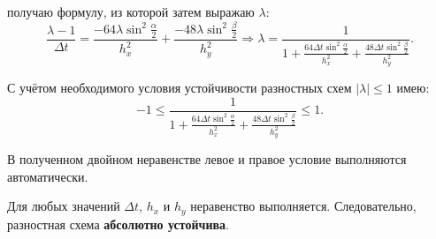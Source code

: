 \documentclass[12pt, a4paper]{report}
\begin{document}
	\par
	получаю формулу, из которой затем выражаю $\lambda$:
	\begin{equation*}
		\frac{\lambda - 1}{\Delta t} = \frac{-64\lambda\sin^{2}{\frac{\alpha}{2}}}{h_{x}^{2}} + \frac{-48\lambda\sin^{2}{\frac{\beta}{2}}}{h_{y}^{2}} \Rightarrow \lambda = \frac{1}{1 + \frac{64\Delta t\sin^{2}{\frac{\alpha}{2}}}{h_{x}^{2}} + \frac{48\Delta t\sin^{2}{\frac{\beta}{2}}}{h_{y}^{2}}}.
	\end{equation*}
	\par
	С учётом необходимого условия устойчивости разностных схем $\lvert \lambda \rvert \le 1$ имею:
	\begin{equation*}
		-1 \le \frac{1}{1 + \frac{64\Delta t\sin^{2}{\frac{\alpha}{2}}}{h_{x}^{2}} + \frac{48\Delta t\sin^{2}{\frac{\beta}{2}}}{h_{y}^{2}}} \le 1.
	\end{equation*}
	\par
	В полученном двойном неравенстве левое и правое условие выполняются автоматически. \par
	Для любых значений $\Delta t$, $h_{x}$ и $h_{y}$ неравенство выполняется. Следовательно, разностная схема \textbf{абсолютно устойчива}.
\end{document}

